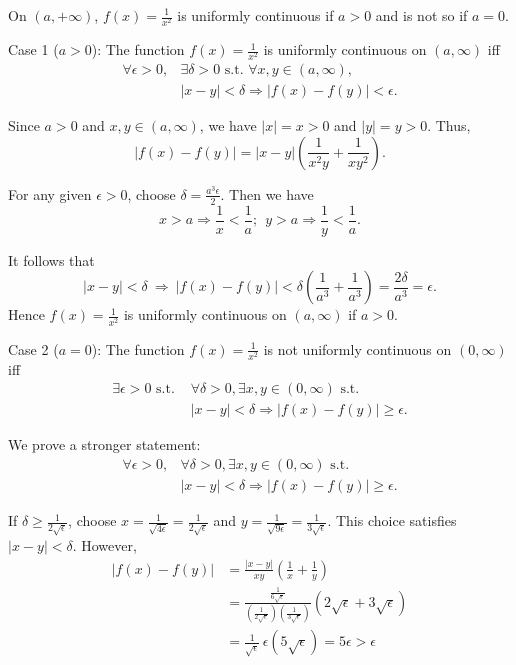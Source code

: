 \begin{exc}
  On $(a,+\infty)$,
  $f(x)=\frac{1}{x^2}$ is uniformly continuous
   if $a>0$ 
   and is not so if $a=0$.
\end{exc}
\begin{solution}
  Case 1 ($a>0$):
  The function $f(x)=\frac{1}{x^2}$ is uniformly continuous
  on $(a,\infty)$ iff
  \begin{align*}
    \forall\epsilon>0,&\exists\delta>0\text{ s.t. }
                        \forall x,y \in(a,\infty),\\
    &|x-y|<\delta\Rightarrow|f(x)-f(y)|<\epsilon.
  \end{align*}

  Since $a>0$ and $x,y \in (a,\infty)$,
  we have $|x|=x>0$ and $|y|=y>0$.  Thus,
\[
|f(x)-f(y)|
=|x-y|\left(\frac{1}{x^2y}+\frac{1}{xy^2}\right).
\]

For any given $\epsilon>0$,
choose $\delta=\frac{a^3\epsilon}{2}$.
Then we have
\begin{displaymath}
  x>a\Rightarrow\frac{1}{x}<\frac{1}{a};\ \ 
  y>a\Rightarrow\frac{1}{y}<\frac{1}{a}.
\end{displaymath}

It follows that
\[
 |x-y|<\delta \ \Rightarrow\ 
|f(x)-f(y)|
<\delta\left(\frac{1}{a^3}+\frac{1}{a^3}\right)
=\frac{2\delta}{a^3}=\epsilon.
\]
Hence $f(x)=\frac{1}{x^2}$ is uniformly continuous on $(a,\infty)$ if
$a>0$.

Case 2 ($a=0$):
The function $f(x)=\frac{1}{x^2}$ is not uniformly continuous
on $(0,\infty)$ iff
\begin{align*}
  \exists\epsilon>0\text{ s.t. } & \forall\delta>0,
  \exists x,y \in (0,\infty)\text{ s.t. }\\
  &|x-y|<\delta\Rightarrow |f(x)-f(y)|\geq\epsilon.
\end{align*}

We prove a stronger statement:
\begin{align*}
  \forall\epsilon>0, & \forall\delta>0,\exists x,y \in (0,\infty)
  \text{ s.t. } \\
  &|x-y|<\delta\Rightarrow |f(x)-f(y)|\geq\epsilon.
\end{align*}

If $\delta\geq\frac{1}{2\sqrt{\epsilon}}$,
 choose
 $x=\frac{1}{\sqrt{4\epsilon}}=\frac{1}{2\sqrt{\epsilon}}$ and $y=\frac{1}{\sqrt{9\epsilon}}=\frac{1}{3\sqrt{\epsilon}}$.
This choice satisfies $|x-y|< \delta$.
However,
\begin{align*}
  |f(x)-f(y)| &=
                \frac{|x-y|}{xy}\left(\frac{1}{x}+\frac{1}{y}\right)\\
 &= \frac{\frac{1}{6\sqrt{\epsilon}}}{\left(\frac{1}{2\sqrt{\epsilon}}\right)\left(\frac{1}{3\sqrt{\epsilon}}\right)}(2\sqrt{\epsilon}+3\sqrt{\epsilon})
  \\
&= \frac{1}{\sqrt{\epsilon}}\,\epsilon(5\sqrt{\epsilon})
= 5\epsilon >\epsilon
\end{align*}


\end{solution}
